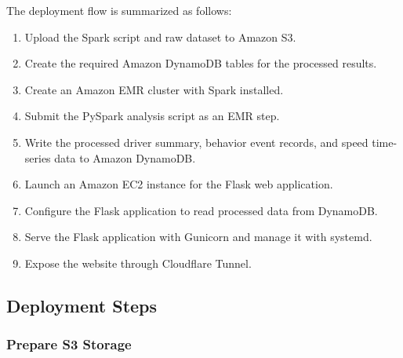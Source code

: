 \documentclass[12pt,a4paper]{article}
\begin{document}
The deployment flow is summarized as follows:

\begin{enumerate}
    \item Upload the Spark script and raw dataset to Amazon S3.
    \item Create the required Amazon DynamoDB tables for the processed results.
    \item Create an Amazon EMR cluster with Spark installed.
    \item Submit the PySpark analysis script as an EMR step.
    \item Write the processed driver summary, behavior event records, and speed time-series data to Amazon DynamoDB.
    \item Launch an Amazon EC2 instance for the Flask web application.
    \item Configure the Flask application to read processed data from DynamoDB.
    \item Serve the Flask application with Gunicorn and manage it with systemd.
    \item Expose the website through Cloudflare Tunnel.
\end{enumerate}

\subsection{Deployment Steps}

\subsubsection{Prepare S3 Storage}
\end{document}
